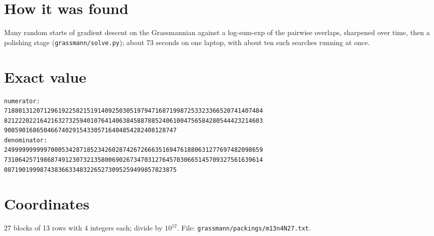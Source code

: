 \documentclass[11pt,a4paper]{article}
\begin{document}
\section{How it was found}
Many random starts of gradient descent on the Grassmannian against a log-sum-exp of the pairwise overlaps, sharpened over time, then a polishing stage (\texttt{grassmann/solve.py}); about 73 seconds on one laptop, with about ten such searches running at once.


\appendix
\section{Exact value}
{\small
\begin{verbatim}
numerator:
718801312071296192258215191409250305197947168719987253323366520741407484
821222022164216327325940107641406384588788524061004756584280544423214603
908590168650466740291543305716404854282408128747
denominator:
249999999999700053428718523426028742672666351694761880631277697482098659
731064257198687491230732135800690267347031276457030665145709327561639614
087190199987438366334832265273095259499857823875
\end{verbatim}}

\section{Coordinates}
27 blocks of 13 rows with 4 integers each; divide by $10^{12}$. File: \texttt{grassmann/packings/m13n4N27.txt}.
{\tiny
\begin{multicols}{3}
\end{multicols}}
\end{document}
